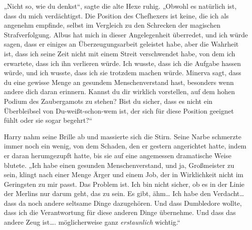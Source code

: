 „Nicht so, wie du denkst“, sagte die alte Hexe ruhig. „Obwohl es natürlich ist, dass du mich verdächtigst. Die Position des Chefhexers ist keine, die ich als angenehm empfinde, selbst im Vergleich zu den Schrecken der magischen Strafverfolgung. Albus hat mich in dieser Angelegenheit überredet, und ich würde sagen, dass er einiges an Überzeugungsarbeit geleistet habe, aber die Wahrheit ist, dass ich seine Zeit nicht mit einem Streit verschwendet habe, von dem ich erwartete, dass ich ihn verlieren würde. Ich wusste, dass ich die Aufgabe hassen würde, und ich wusste, dass ich sie trotzdem machen würde. Minerva sagt, dass du eine gewisse Menge an gesundem Menschenverstand hast, besonders wenn andere dich daran erinnern. Kannst du dir wirklich vorstellen, auf dem hohen Podium des Zaubergamots zu stehen? Bist du sicher, dass es nicht ein Überbleibsel von Du-weißt-schon-wem ist, der sich für diese Position geeignet fühlt oder sie sogar begehrt?“

Harry nahm seine Brille ab und massierte sich die Stirn. Seine Narbe schmerzte immer noch ein wenig, von dem Schaden, den er gestern angerichtet hatte, indem er daran herumgezupft hatte, bis sie auf eine angemessen dramatische Weise blutete.
„Ich habe einen gesunden Menschenverstand, und ja, Großmeister zu sein, klingt nach einer Menge Ärger und einem Job, der in Wirklichkeit nicht im Geringsten zu mir passt. Das Problem ist. Ich bin nicht sicher, ob es in der Linie der Merlins nur darum geht, das zu sein. Es gibt, ähm… Ich habe den Verdacht… dass da noch andere seltsame Dinge dazugehören. Und dass Dumbledore wollte, dass ich die Verantwortung für diese anderen Dinge übernehme. Und dass das andere Zeug ist…. möglicherweise ganz \emph{erstaunlich} wichtig.“

